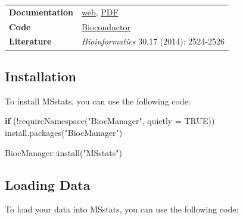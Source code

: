 \documentclass[
]{book}
\newenvironment{Shaded}{\begin{snugshade}}{\end{snugshade}}
\newcommand{\AttributeTok}[1]{\textcolor[rgb]{0.77,0.63,0.00}{#1}}
\newcommand{\ConstantTok}[1]{\textcolor[rgb]{0.00,0.00,0.00}{#1}}
\newcommand{\ControlFlowTok}[1]{\textcolor[rgb]{0.13,0.29,0.53}{\textbf{#1}}}
\newcommand{\FunctionTok}[1]{\textcolor[rgb]{0.00,0.00,0.00}{#1}}
\newcommand{\NormalTok}[1]{#1}
\newcommand{\OtherTok}[1]{\textcolor[rgb]{0.56,0.35,0.01}{#1}}
\newcommand{\SpecialCharTok}[1]{\textcolor[rgb]{0.00,0.00,0.00}{#1}}
\newcommand{\StringTok}[1]{\textcolor[rgb]{0.31,0.60,0.02}{#1}}
\begin{document}
\begin{longtable}[]{@{}
  >{\raggedright\arraybackslash}p{}
  >{\raggedright\arraybackslash}p{}@{}}
\toprule\noalign{}
\endhead
\bottomrule\noalign{}
\endlastfoot
\textbf{Documentation} & \href{https://msstats.org}{web}, \href{https://bioconductor.org/packages/release/bioc/manuals/MSstats/man/MSstats.pdf}{PDF} \\
\textbf{Code} & \href{https://www.bioconductor.org/packages/release/bioc/html/MSstats.html}{Bioconductor} \\
\textbf{Literature} & \emph{Bioinformatics} 30.17 (2014): 2524-2526 \\
\end{longtable}

\hypertarget{installation-1}{%
\subsection{Installation}\label{installation-1}}

To install MSstats, you can use the following code:

\begin{Shaded}
\begin{Highlighting}[]
\ControlFlowTok{if}\NormalTok{ (}\SpecialCharTok{!}\FunctionTok{requireNamespace}\NormalTok{(}\StringTok{"BiocManager"}\NormalTok{, }\AttributeTok{quietly =} \ConstantTok{TRUE}\NormalTok{))}
    \FunctionTok{install.packages}\NormalTok{(}\StringTok{"BiocManager"}\NormalTok{)}

\NormalTok{BiocManager}\SpecialCharTok{::}\FunctionTok{install}\NormalTok{(}\StringTok{"MSstats"}\NormalTok{)}
\end{Highlighting}
\end{Shaded}

\hypertarget{loading-data}{%
\subsection{Loading Data}\label{loading-data}}

To load your data into MSstats, you can use the following code:

\begin{Shaded}
\end{Shaded}
\end{document}
